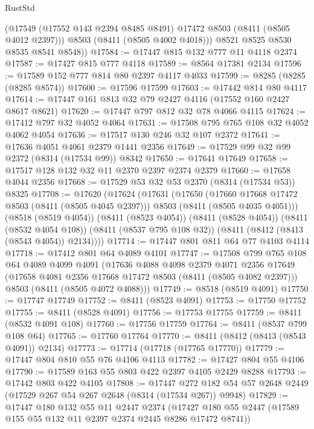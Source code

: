 \begin{lexlean}{RustStd}
\begin{coremodule}
          (@17549 (@17552 @143 @2394 @8485 @8491) @17472 @8503 (@8411 (@8505 @4012 @2397)))
          @8503
          (@8411 (@8505 @4002 @4018)))
        @8521
        @8525
        @8530
        @8535
        @8541
        @8548))
@17584 := @17447 @815 @132 @777 @11 @4118 @2374
@17587 := @17427 @815 @777 @4118
@17589 := @8564 @17381 @2134
@17596 := @17589 @152 @777 @814 @80 @2397 @4117 @4033
@17599 := @8285 (@8285 (@8285 @8574))
@17600 := @17596 @17599
@17603 := @17442 @814 @80 @4117
@17614 := @17447 @161 @813 @32 @79 @2427 @4116 (@17552 @160 @2427 @8617 @8621)
@17620 := @17447 @797 @812 @32 @78 @4066 @4115
@17624 := @17412 @797 @32 @4052 @4064
@17631 := @17508 @795 @765 @108 @32 @4052 @4062 @4054
@17636 := @17517 @130 @246 @32 @107 @2372
@17641 := @17636 @4051 @4061 @2379 @1441 @2356
@17649 := @17529 @99 @32 @99 @2372 (@8314 (@17534 @99)) @8342
@17650 := @17641 @17649
@17658 := @17517 @128 @132 @32 @11 @2370 @2397 @2374 @2379
@17660 := @17658 @4044 @2356
@17668 := @17529 @53 @32 @53 @2370 (@8314 (@17534 @53)) @8325
@17708 := @17620
    (@17624
      (@17631
        (@17650
          (@17660 @17668 @17472 @8503 (@8411 (@8505 @4045 @2397)))
          @8503
          (@8411 (@8505 @4035 @4051)))
        (@8518 (@8519 @4054))
        (@8411 (@8523 @4054))
        (@8411 (@8528 @4054))
        (@8411 (@8532 @4054 @108))
        (@8411 (@8537 @795 @108 @32))
        (@8411 (@8412 (@8413 (@8543 @4054)) @2134))))
@17714 := @17447 @801 @811 @64 @77 @4103 @4114
@17718 := @17412 @801 @64 @4089 @4101
@17747 := @17508
    @799
    @765
    @108
    @64
    @4089
    @4099
    @4091
    (@17636
      @4088
      @4098
      @2379
      @4071
      @2356
      @17649
      (@17658 @4081 @2356 @17668 @17472 @8503 (@8411 (@8505 @4082 @2397)))
      @8503
      (@8411 (@8505 @4072 @4088)))
@17749 := @8518 (@8519 @4091)
@17750 := @17747 @17749
@17752 := @8411 (@8523 @4091)
@17753 := @17750 @17752
@17755 := @8411 (@8528 @4091)
@17756 := @17753 @17755
@17759 := @8411 (@8532 @4091 @108)
@17760 := @17756 @17759
@17764 := @8411 (@8537 @799 @108 @64)
@17765 := @17760 @17764
@17770 := @8411 (@8412 (@8413 (@8543 @4091)) @2134)
@17773 := @17714 (@17718 (@17765 @17770))
@17779 := @17447 @804 @810 @55 @76 @4106 @4113
@17782 := @17427 @804 @55 @4106
@17790 := @17589 @163 @55 @803 @422 @2397 @4105 @2429 @8288
@17793 := @17442 @803 @422 @4105
@17808 := @17447
    @272
    @182
    @54
    @57
    @2648
    @2449
    (@17529 @267 @54 @267 @2648 (@8314 (@17534 @267)) @9948)
@17829 := @17447
    @180
    @132
    @55
    @11
    @2447
    @2374
    (@17427 @180 @55 @2447 (@17589 @155 @55 @132 @11 @2397 @2374 @2445 @8286 @17472 @8741))

\end{coremodule}
\end{lexlean}
